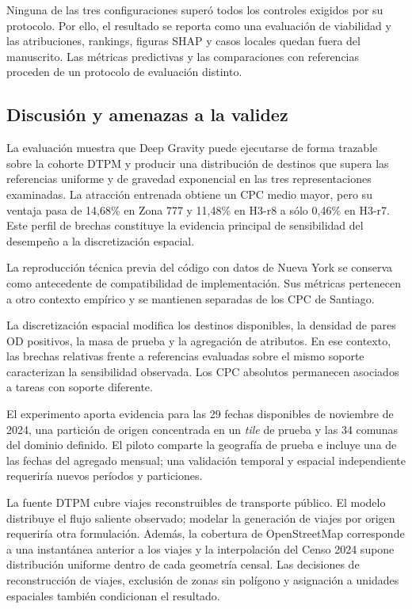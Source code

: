 Ninguna de las tres configuraciones superó todos los controles exigidos por su protocolo. Por ello, el resultado se reporta como una evaluación de viabilidad y las atribuciones, rankings, figuras SHAP y casos locales quedan fuera del manuscrito. Las métricas predictivas y las comparaciones con referencias proceden de un protocolo de evaluación distinto.

\subsection{Discusión y amenazas a la validez}
\label{sec:discusion_amenazas_validez}

La evaluación muestra que Deep Gravity puede ejecutarse de forma trazable sobre la cohorte DTPM y producir una distribución de destinos que supera las referencias uniforme y de gravedad exponencial en las tres representaciones examinadas. La atracción entrenada obtiene un CPC medio mayor, pero su ventaja pasa de 14,68\% en Zona 777 y 11,48\% en H3-r8 a sólo 0,46\% en H3-r7. Este perfil de brechas constituye la evidencia principal de sensibilidad del desempeño a la discretización espacial.

La reproducción técnica previa del código con datos de Nueva York se conserva como antecedente de compatibilidad de implementación. Sus métricas pertenecen a otro contexto empírico y se mantienen separadas de los CPC de Santiago.

La discretización espacial modifica los destinos disponibles, la densidad de pares OD positivos, la masa de prueba y la agregación de atributos. En ese contexto, las brechas relativas frente a referencias evaluadas sobre el mismo soporte caracterizan la sensibilidad observada. Los CPC absolutos permanecen asociados a tareas con soporte diferente.

El experimento aporta evidencia para las 29 fechas disponibles de noviembre de 2024, una partición de origen concentrada en un \textit{tile} de prueba y las 34 comunas del dominio definido. El piloto comparte la geografía de prueba e incluye una de las fechas del agregado mensual; una validación temporal y espacial independiente requeriría nuevos períodos y particiones.

La fuente DTPM cubre viajes reconstruibles de transporte público. El modelo distribuye el flujo saliente observado; modelar la generación de viajes por origen requeriría otra formulación. Además, la cobertura de OpenStreetMap corresponde a una instantánea anterior a los viajes y la interpolación del Censo 2024 supone distribución uniforme dentro de cada geometría censal. Las decisiones de reconstrucción de viajes, exclusión de zonas sin polígono y asignación a unidades espaciales también condicionan el resultado.


